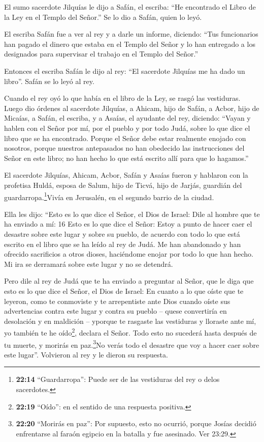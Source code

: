  El sumo sacerdote Jilquías le dijo a Safán, el escriba:
``He encontrado el Libro de la Ley en el Templo del Señor.'' Se lo dio a
Safán, quien lo leyó.

 El escriba Safán fue a ver al rey y a darle un informe,
diciendo: ``Tus funcionarios han pagado el dinero que estaba en el
Templo del Señor y lo han entregado a los designados para supervisar el
trabajo en el Templo del Señor.''

 Entonces el escriba Safán le dijo al rey: ``El sacerdote
Jilquías me ha dado un libro''. Safán se lo leyó al rey.

 Cuando el rey oyó lo que había en el libro de la Ley, se
rasgó las vestiduras.  Luego dio órdenes al sacerdote
Jilquías, a Ahicam, hijo de Safán, a Acbor, hijo de Micaías, a Safán, el
escriba, y a Asaías, el ayudante del rey, diciendo: 
``Vayan y hablen con el Señor por mí, por el pueblo y por todo Judá,
sobre lo que dice el libro que se ha encontrado. Porque el Señor debe
estar realmente enojado con nosotros, porque nuestros antepasados no han
obedecido las instrucciones del Señor en este libro; no han hecho lo que
está escrito allí para que lo hagamos.''

 El sacerdote Jilquías, Ahicam, Acbor, Safán y Asaías
fueron y hablaron con la profetisa Huldá, esposa de Salum, hijo de
Ticvá, hijo de Jarjás, guardián del guardarropa.\footnote{\textbf{22:14}
  ``Guardarropa'': Puede ser de las vestiduras del rey o delos
  sacerdotes.}Vivía en Jerusalén, en el segundo barrio de la ciudad.

 Ella les dijo: ``Esto es lo que dice el Señor, el Dios de
Israel: Dile al hombre que te ha enviado a mí: 16 Esto es lo que dice el
Señor: Estoy a punto de hacer caer el desastre sobre este lugar y sobre
su pueblo, de acuerdo con todo lo que está escrito en el libro que se ha
leído al rey de Judá.  Me han abandonado y han ofrecido
sacrificios a otros dioses, haciéndome enojar por todo lo que han hecho.
Mi ira se derramará sobre este lugar y no se detendrá.

 Pero dile al rey de Judá que te ha enviado a preguntar al
Señor, que le diga que esto es lo que dice el Señor, el Dios de Israel:
En cuanto a lo que oíste que te leyeron,  como te
conmoviste y te arrepentiste ante Dios cuando oíste sus advertencias
contra este lugar y contra su pueblo -- quese convertiría en desolación
y en maldición -- yporque te rasgaste las vestiduras y lloraste ante mí,
yo también te he oído\footnote{\textbf{22:19} ``Oído'': en el sentido de
  una respuesta positiva.}, declara el Señor.  Todo esto no
sucederá hasta después de tu muerte, y morirás en paz.\footnote{\textbf{22:20}
  ``Morirás en paz'': Por supuesto, esto no ocurrió, porque Josías
  decidió enfrentarse al faraón egipcio en la batalla y fue asesinado.
  Ver 23:29.}No verás todo el desastre que voy a hacer caer sobre este
lugar''. Volvieron al rey y le dieron su respuesta.

